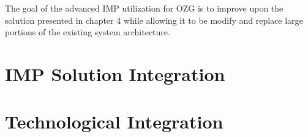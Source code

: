 
The goal of the advanced IMP utilization for OZG is to improve upon the solution presented in chapter 4 while allowing it to be modify and replace large portions of the existing system architecture. 

\section{IMP Solution Integration}



\section{Technological Integration}

